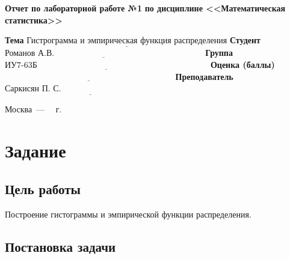\documentclass[12pt]{report}
\begin{document}
\begin{titlepage}
		\begin{center}
			\noindent\begin{minipage}{1.1\textwidth}\centering
				\Large\textbf{  Отчет по лабораторной работе №1}\newline
				\textbf{по дисциплине <<Математическая статистика>>}\newline\newline\newline
			\end{minipage}
		\end{center}
		
		\noindent\textbf{Тема} $\underline{\text{Гистрограмма и эмпирическая функция распределения}}$\newline\newline
		\noindent\textbf{Студент} $\underline{\text{Романов А.В.~~~~~~~~~~~~~~~~~~~~~~~~~~~~~~~~~~~~~~~~~~~~~~~~~~~~~}}$\newline\newline
		\noindent\textbf{Группа} $\underline{\text{ИУ7-63Б~~~~~~~~~~~~~~~~~~~~~~~~~~~~~~~~~~~~~~~~~~~~~~~~~~~~~~~~~~~~~}}$\newline\newlineg
		\noindent\textbf{Оценка (баллы)} $\underline{\text{~~~~~~~~~~~~~~~~~~~~~~~~~~~~~~~~~~~~~~~~~~~~~~~~~~~~~~~~~~~~}}$\newline\newline
		\noindent\textbf{Преподаватель} $\underline{\text{Саркисян П. С.~~~~~~~~~~~~~~~~~~~~~~~~~~~~~~~~~~~~~~~~~}}$\newline\newline\newline
		
		\begin{center}
			\vfill
			Москва~---~\the\year
			~г.
		\end{center}
	\end{titlepage}

\chapter*{Задание}

\section*{Цель работы}
Построение гистограммы и эмпирической функции распределения.

\section*{Постановка задачи}
\end{document}
